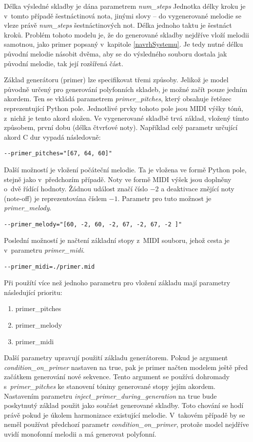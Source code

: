 Délka výsledné skladby je dána parametrem \emph{num\_steps} 
Jednotka délky kroku je v~tomto případě šestnáctinová nota,
jinými slovy -- do vygenerované melodie se vleze právě \emph{num\_steps} šestnáctinových not.
Délka jednoho taktu je šestnáct kroků.
Problém tohoto modelu je, že do generované skladby nejdříve vloží melodii samotnou, 
jako primer popsaný v~kapitole \ref{navrhSystemu}.
Je tedy nutné délku původní melodie násobit dvěma,
aby se do výsledného souboru dostala jak původní melodie,
tak její rozšířená část.
\cite{google_git_polyphony}
\par

Základ generátoru (primer) lze specifikovat třemi způsoby.
Jelikož je model původně určený pro generování polyfonních skladeb,
je možné začít pouze jedním akordem.
Ten se vkládá parametrem \emph{primer\_pitches},
který obsahuje řetězec reprezentující Python pole.
Jednotlivé prvky tohoto pole jsou MIDI výšky tónů,
z~nichž je tento akord složen.
Ve vygenerované skladbě trvá základ, 
vložený tímto způsobem, první dobu (délka čtvrťové noty).
Například celý parametr určující akord C dur vypadá následovně:

\begin{verbatim}
--primer_pitches="[67, 64, 60]"
\end{verbatim}
Další možností je vložení počáteční melodie.
Ta je vložena ve formě Python pole, stejně jako v~předchozím případě.
Noty ve formě MIDI výšek jsou doplněny o~dvě řídící hodnoty.
Žádnou událost značí číslo $-2$ a 
deaktivace znějící noty (note-off) je reprezentována číslem $-1$.
Parametr pro tuto možnost je \emph{primer\_melody}.

\begin{verbatim}
--primer_melody="[60, -2, 60, -2, 67, -2, 67, -2 ]"  
\end{verbatim}
Poslední možností je načtení základní stopy z~MIDI souboru,
jehož cesta je v~parametru \emph{primer\_midi}.
\begin{verbatim}
--primer_midi=./primer.mid 
\end{verbatim}
Při použítí více než jednoho parametru pro vložení základu
mají parametry následující prioritu:
\begin{enumerate}
    \item primer\_pitches
    \item primer\_melody
    \item primer\_midi
\end{enumerate}
Další parametry upravují použití základu generátorem.
Pokud je argument \emph{condition\_on\_primer} nastaven na true, 
pak je primer načten modelem ještě před začátkem generování nové sekvence.
Tento argument se používá dohromady s~\emph{primer\_pitches} 
ke stanovení tóniny generované stopy jejím akordem.
Nastavením parametru \emph{inject\_primer\_during\_generation} na true
bude poskytnutý základ použit jako součást generované skladby.
Toto chování se hodí právě pokud je úkolem harmonizace existující melodie.
V~takovém případě by se neměl používat předchozí parametr \emph{condition\_on\_primer},
protože model nejdříve uvidí monofonní melodii 
a má generovat polyfonní.
\cite{google_git_polyphony}

